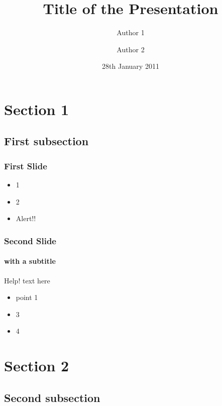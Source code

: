 \documentclass{beamer}
\title[Short Title]{Title of the Presentation}
\author[Auth. 1 \and Auth.2]{Author 1 \and Author 2}
\institute[UCL]{%
  Department of Statistical Science \\ %
  University College London
}
\date{28th January 2011}
\begin{document}
\begin{frame}
  \frametitle{}
  \titlepage
\end{frame}

\section{Section 1}
\subsection{First subsection}

\begin{frame}
  \frametitle{First Slide}
  \begin{itemize}
  \item 1
  \item 2
    \pause
  \item \alert{Alert!!}
  \end{itemize}
\end{frame}

\begin{frame}
  \frametitle{Second Slide}
  \framesubtitle{with a subtitle}
  \begin{alertblock}{Help!}
    text here
    \begin{itemize}
    \item point 1
    \end{itemize}
  \end{alertblock}
  
  \begin{example}
    \begin{itemize}
    \item 3
    \item 4
    \end{itemize}
  \end{example}
\end{frame}

\section{Section 2}
\subsection{Second subsection}

\end{document}
